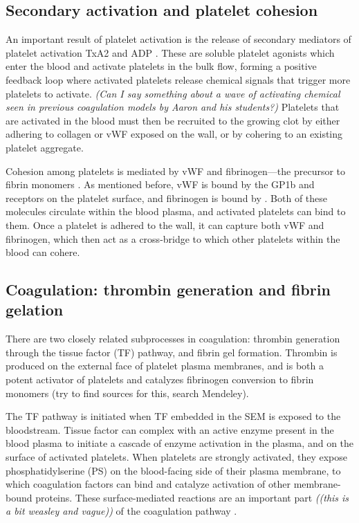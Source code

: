 \subsection{Secondary activation and platelet cohesion}
\label{sec:second-wave-activ}

An important result of platelet activation is the release of secondary
mediators of platelet activation TxA2 and ADP \cite{Bye2016}. These
are soluble platelet agonists which enter the blood and activate
platelets in the bulk flow, forming a positive feedback loop where
activated platelets release chemical signals that trigger more
platelets to activate. \emph{(Can I say something about a wave of activating
chemical seen in previous coagulation models by Aaron and his
students?)} Platelets that are activated in the blood must
then be recruited to the growing clot by either adhering to collagen
or vWF exposed on the wall, or by cohering to an existing platelet
aggregate. 

Cohesion among platelets is mediated by vWF and fibrinogen---the
precursor to fibrin monomers \cite{Fogelson2015}. As mentioned before,
vWF is bound by the GP1b and  receptors on the
platelet surface, and fibrinogen is bound by . Both of
these molecules circulate within the blood plasma, and activated
platelets can bind to them. Once a platelet is adhered to the wall, it
can capture both vWF and fibrinogen, which then act as a cross-bridge
to which other platelets within the blood can cohere.

\subsection{Coagulation: thrombin generation and fibrin gelation}
\label{sec:coagulation}

There are two closely related subprocesses in coagulation: thrombin
generation through the tissue factor (TF) pathway, and fibrin gel
formation. Thrombin is produced on the external face of platelet
plasma membranes, and is both a potent activator of platelets
\cite{Heemskerk2002,Heemskerk2013} and catalyzes fibrinogen conversion
to fibrin monomers (try to find sources for this, search Mendeley).


The TF pathway is initiated when TF embedded in the SEM is exposed to
the bloodstream. Tissue factor can complex with an active enzyme
present in the blood plasma to initiate a cascade of enzyme activation
in the plasma, and on the surface of activated platelets. When
platelets are strongly activated, they expose phosphatidylserine (PS)
on the blood-facing side of their plasma membrane, to which
coagulation factors can bind and catalyze activation of other
membrane-bound proteins. These surface-mediated reactions are an
important part \emph{((this is a bit weasley and vague))} of the coagulation
pathway \cite{Fogelson1998,Kuharsky2001}.
	
